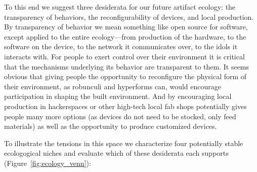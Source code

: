 To this end we suggest three desiderata for our future artifact ecology: the transparency of behaviors, the reconfigurability of devices, and local production.
By transparency of behavior we mean something like open source for software, except applied to the entire ecology---from production of the hardware, to the software on the device, to the network it communicates over, to the idols it interacts with. 
For people to exert control over their environment it is critical that the mechanisms underlying its behavior are transparent to them. 
It seems obvious that giving people the opportunity to reconfigure the physical form of their environment, as robunculi and hyperforms can, would encourage participation in shaping the built environment. 
And by encouraging local production in hackerspaces or other high-tech local fab shops potentially gives people many more options (as devices do not need to be stocked, only feed materials) as well as the opportunity to produce customized devices. 

To illustrate the tensions in this space we characterize four potentially stable ecologogical niches and evaluate which of these desiderata each supports (Figure~\ref{fig:ecology_venn}):

